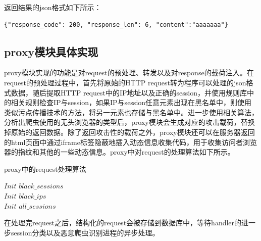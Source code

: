 \documentclass[doctor,privacy,twoside]{buaa_mac}
\begin{document}
返回结果的json格式如下所示：
\lstset{language=JavaScript}
\begin{lstlisting}
{"response_code": 200, "response_len": 6, "content":"aaaaaaa"}
\end{lstlisting}




\subsection{proxy模块具体实现}

proxy模块实现的功能是对request的预处理、转发以及对response的载荷注入。在request的预处理过程中，首先将原始的HTTP request转为程序可以处理的json格式数据，随后提取HTTP request中的IP地址以及正确的session，并使用规则库中的相关规则检查IP与session，如果IP与session任意元素出现在黑名单中，则使用类似污点传播技术的方法，将另一元素也存储与黑名单中。进一步使用相关算法，分析出爬虫使用的无头浏览器的类型后，proxy模块会生成对应的攻击载荷，替换掉原始的返回数据。除了返回攻击性的载荷之外，proxy模块还可以在服务器返回的html页面中通过iframe标签隐蔽地插入动态信息收集代码，用于收集访问者浏览器的指纹和其他的一些动态信息。proxy中对request的处理算法如下所示。

\begin{algorithm}[!h]
  \caption{proxy中的request处理算法}

  $Init$ $black\_{}sessions$\\
  $Init$ $black\_{}ips$ \\
  $Init$ $all\_{}sessions$\\  
  
 

\end{algorithm}


在处理完request之后，结构化的request会被存储到数据库中，等待handler的进一步session分类以及恶意爬虫识别进程的异步处理。
\end{document}

